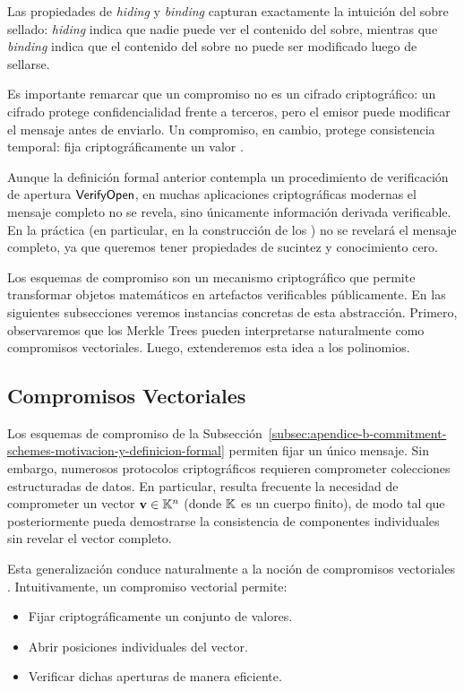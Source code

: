 Las propiedades de \textit{hiding} y \textit{binding} capturan exactamente la intuición del sobre sellado: \textit{hiding} indica que nadie puede ver el contenido del sobre, mientras que \textit{binding} indica que el contenido del sobre no puede ser modificado luego de sellarse.

Es importante remarcar que un compromiso no es un cifrado criptográfico: un cifrado protege confidencialidad frente a terceros, pero el emisor puede modificar el mensaje antes de enviarlo. Un compromiso, en cambio, protege consistencia temporal: fija criptográficamente un valor \cite{katz}.

Aunque la definición formal anterior contempla un procedimiento de verificación de apertura $\mathsf{VerifyOpen}$, en muchas aplicaciones criptográficas modernas el mensaje completo no se revela, sino únicamente información derivada verificable. En la práctica (en particular, en la construcción de los \SNARK) no se revelará el mensaje completo, ya que queremos tener propiedades de sucintez y conocimiento cero.

Los esquemas de compromiso son un mecanismo criptográfico que permite transformar objetos matemáticos en artefactos verificables públicamente. En las siguientes subsecciones veremos instancias concretas de esta abstracción. Primero, observaremos que los Merkle Trees pueden interpretarse naturalmente como compromisos vectoriales. Luego, extenderemos esta idea a los polinomios.

\subsection{Compromisos Vectoriales}
\label{subsec:apendice-b-commitment-schemes-compromisos-vectoriales}

Los esquemas de compromiso de la Subsección~\ref{subsec:apendice-b-commitment-schemes-motivacion-y-definicion-formal} permiten fijar un único mensaje. Sin embargo, numerosos protocolos criptográficos requieren comprometer colecciones estructuradas de datos. En particular, resulta frecuente la necesidad de comprometer un vector $\mathbf{v} \in \mathbb{K}^n$ (donde $\mathbb{K}$ es un cuerpo finito), de modo tal que posteriormente pueda demostrarse la consistencia de componentes individuales sin revelar el vector completo.

Esta generalización conduce naturalmente a la noción de compromisos vectoriales \cite{Catalano2013}. Intuitivamente, un compromiso vectorial permite:
\begin{itemize}[itemsep=0.1cm]
	\item Fijar criptográficamente un conjunto de valores.
	\item Abrir posiciones individuales del vector.
	\item Verificar dichas aperturas de manera eficiente.
\end{itemize}

